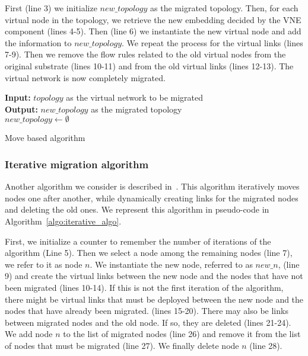 First (line 3) we initialize $new\_topology$ as the migrated topology. Then, for each virtual node in the topology, we retrieve the new embedding decided by the VNE component (lines 4-5).
Then (line 6) we instantiate the new virtual node and add the information to $new\_topology$.
We repeat the process for the virtual links (lines 7-9).
Then we remove the flow rules related to the old virtual nodes from the original substrate (lines 10-11) and from the old virtual links (lines 12-13).
The virtual network is now completely migrated.




\begin{algorithm}[ht]
\textbf{Input: }$topology$ as the virtual network to be migrated\\
\textbf{Output: } $new\_topology$ as the migrated topology\\
$new\_topology \gets \emptyset$\\
\caption{Move based algorithm}
\label{algo:move_algo}
\end{algorithm}


\subsubsection{Iterative migration algorithm}
Another algorithm we consider is described in~\cite{vnm-lo2013}.
This algorithm iteratively moves nodes one after another, while dynamically creating links for the migrated nodes and deleting the old ones.
We represent this algorithm in pseudo-code in Algorithm~\ref{algo:iterative_algo}.

First, we initialize a counter to remember the number of iterations of the algorithm (Line 5).
Then we select a node among the remaining nodes (line 7), we refer to it as node $n$. We instantiate the new node, referred to as $new\_n$, (line 9) and create the virtual links between the new node and the nodes that have not been migrated (lines 10-14).
If this is not the first iteration of the algorithm, there might be virtual links that must be deployed between the new node and the nodes that have already been migrated. (lines 15-20).
There may also be links between migrated nodes and the old node.
If so, they are deleted (lines 21-24).
We add node $n$ to the list of migrated nodes (line 26) and remove it from the list of nodes that must be migrated (line 27). We finally delete node $n$ (line 28).

